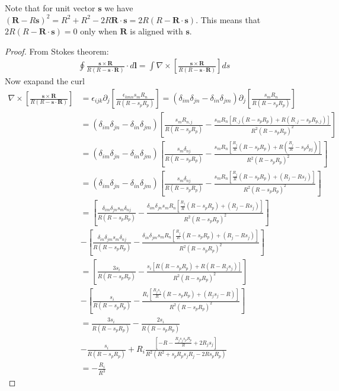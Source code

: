 \documentclass[10pt]{report}
\begin{document}
{\begin{mytheorem}
\end{mytheorem}



Note that for unit vector $\bm s$ we have $\left(\bm R-R\bm s\right)^2=R^2+R^2-2R\bm R\cdot\bm s=2R(R-\bm R\cdot\bm s)$. This means that $2R(R-\bm R\cdot\bm s)=0$ only when $\bm R$ is aligned with $\bm s$.

\begin{proof}
From Stokes theorem:
\begin{align}
\oint\frac{\bm s\times\bm R}{R(R-\bm s\cdot\bm R)}\cdot d\bm l=\int\nabla\times\left[\frac{\bm s\times\bm R}{R(R-\bm s\cdot\bm R)}\right]ds
\end{align}
Now exapand the curl
\begin{align}
\nabla\times\left[\frac{\bm s\times\bm R}{R(R-\bm s\cdot\bm R)}\right]&=\epsilon_{ijk}\partial_j\left[\frac{\epsilon_{kmn}s_mR_n}{R(R-s_pR_p)}\right]=\left(\delta_{im}\delta_{jn}-\delta_{in}\delta_{jm}\right)\partial_j\left[\frac{s_mR_n}{R(R-s_pR_p)}\right]\nonumber\\
&=\left(\delta_{im}\delta_{jn}-\delta_{in}\delta_{jm}\right)\left[\frac{s_mR_{n,j}}{R(R-s_pR_p)}-\frac{s_mR_{n}\left[R_{,j}(R-s_pR_p)+R(R_{,j}-s_pR_{p,j})\right]}{R^2(R-s_pR_p)^2}\right]\nonumber\\
&=\left(\delta_{im}\delta_{jn}-\delta_{in}\delta_{jm}\right)\left[\frac{s_m\delta_{nj}}{R(R-s_pR_p)}-\frac{s_mR_{n}\left[\frac{R_j}{R}(R-s_pR_p)+R(\frac{R_j}{R}-s_p\delta_{pj})\right]}{R^2(R-s_pR_p)^2}\right]\nonumber\\
&=\left(\delta_{im}\delta_{jn}-\delta_{in}\delta_{jm}\right)\left[\frac{s_m\delta_{nj}}{R(R-s_pR_p)}-\frac{s_mR_{n}\left[\frac{R_j}{R}(R-s_pR_p)+(R_j-Rs_j)\right]}{R^2(R-s_pR_p)^2}\right]\nonumber\\
&=\left[\frac{\delta_{im}\delta_{jn}s_m\delta_{nj}}{R(R-s_pR_p)}-\frac{\delta_{im}\delta_{jn}s_mR_{n}\left[\frac{R_j}{R}(R-s_pR_p)+(R_j-Rs_j)\right]}{R^2(R-s_pR_p)^2}\right]\nonumber\\
&-\left[\frac{\delta_{in}\delta_{jm}s_m\delta_{nj}}{R(R-s_pR_p)}-\frac{\delta_{in}\delta_{jm}s_mR_{n}\left[\frac{R_j}{R}(R-s_pR_p)+(R_j-Rs_j)\right]}{R^2(R-s_pR_p)^2}\right]\nonumber\\
&=\left[\frac{3s_i}{R(R-s_pR_p)}-\frac{s_i\left[R(R-s_pR_p)+R(R-R_{j}s_j)\right]}{R^2(R-s_pR_p)^2}\right]\nonumber\\
&-\left[\frac{s_i}{R(R-s_pR_p)}-\frac{R_{i}\left[\frac{R_js_j}{R}(R-s_pR_p)+(R_js_j-R)\right]}{R^2(R-s_pR_p)^2}\right]\nonumber\\
&=\frac{3s_i}{R(R-s_pR_p)}-\frac{2s_i}{R(R-s_pR_p)}\nonumber\\
&-\frac{s_i}{R(R-s_pR_p)}+R_{i}\frac{\left[-R-\frac{R_js_js_pR_p}{R}+2R_js_j\right]}{R^2(R^2+s_pR_ps_jR_j-2Rs_pR_p)}\nonumber\\
&=-\frac{R_i}{R^3}
\end{align}
\end{proof}

}
\end{document}
